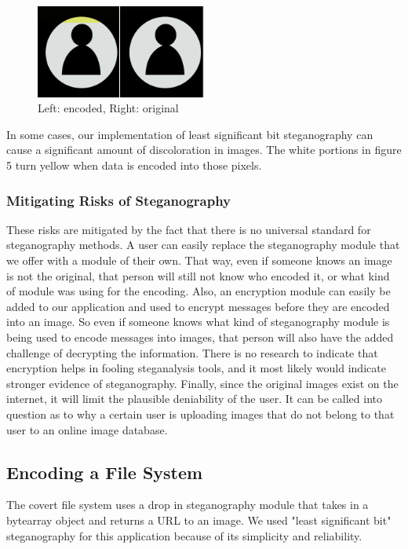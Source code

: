 \begin{figure}[h]
	\includegraphics[width=0.5\textwidth]{comparison}
	\caption{Left: encoded, Right: original}
\end{figure}
In some cases, our implementation of least significant bit steganography can cause a significant amount of discoloration in images. The white portions in figure 5 turn yellow when data is encoded into those pixels. 

\subsubsection{Mitigating Risks of Steganography}
These risks are mitigated by the fact that there is no universal standard for steganography methods. A user can easily replace the steganography module that we offer with a module of their own. That way, even if someone knows an image is not the original, that person will still not know who encoded it, or what kind of module was using for the encoding. Also, an encryption module can easily be added to our application and used to encrypt messages before they are encoded into an image. So even if someone knows what kind of steganography module is being used to encode messages into images, that person will also have the added challenge of decrypting the information. There is no research to indicate that encryption helps in fooling steganalysis tools, and it most likely would indicate stronger evidence of steganography. Finally, since the original images exist on the internet, it will limit the plausible deniability of the user. It can be called into question as to why a certain user is uploading images that do not belong to that user to an online image database. 

\subsection{Encoding a File System}

The covert file system uses a drop in steganography module that takes in a bytearray object and returns a URL to an image. We used "least significant bit" steganography for this application because of its simplicity and reliability.

